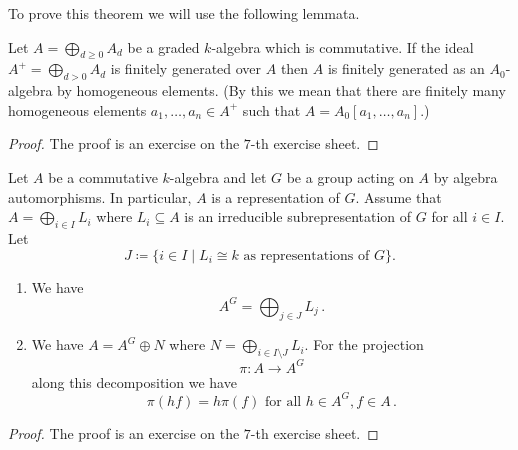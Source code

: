 To prove this theorem we will use the following lemmata.


\begin{lemma}\label{lemma: technical lemma about generating}
  Let $A = \bigoplus_{d \geq 0} A_d$ be a graded $k$-algebra which is commutative.
  If the ideal $A^+ = \bigoplus_{d > 0} A_d$ is finitely generated over $A$ then $A$ is finitely generated as an $A_0$-algebra by homogeneous elements.
  (By this we mean that there are finitely many homogeneous elements $a_1, \dotsc, a_n \in A^+$ such that $A = A_0[a_1, \dotsc, a_n]$.)
\end{lemma}
\begin{proof}
  The proof is an exercise on the $7$-th exercise sheet.
\end{proof}


\begin{lemma}\label{lemma: projection reynold operator}
  Let $A$ be a commutative $k$-algebra and let $G$ be a group acting on $A$ by algebra automorphisms.
  In particular, $A$ is a representation of $G$.
  Assume that $A = \bigoplus_{i \in I} L_i$ where $L_i \subseteq A$ is an irreducible subrepresentation of $G$ for all $i \in I$.
  Let
  \[
              J
    \coloneqq \{
                i \in I
              \mid
                      L_i
                \cong k
                \text{ as representations of $G$}
              \}.
  \]
  \begin{enumerate}[label=\emph{\alph*)},leftmargin=*]
    \item
      We have
      \[
          A^G
        = \bigoplus_{j \in J} L_j \,.
      \]
    \item
      We have $A = A^G \oplus N$ where $N = \bigoplus_{i \in I \setminus J} L_i$. For the projection
      \[
                \pi
        \colon  A
        \to     A^G
      \]
      along this decomposition we have
      \[
          \pi(hf)
        = h\pi(f)
        \text{ for all }
        h \in A^G,
        f \in A \,.
      \]
  \end{enumerate}
\end{lemma}
\begin{proof}
  The proof is an exercise on the $7$-th exercise sheet.
\end{proof}


